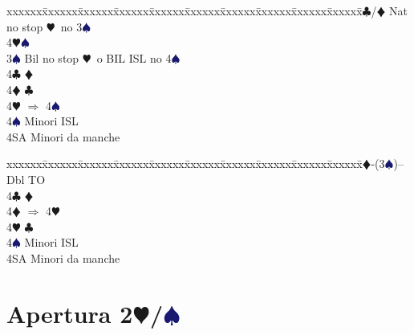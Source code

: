 \documentclass[a4paper,italian]{article}
\newcommand{\BC}{\textcolor{OliveGreen}{$\clubsuit$}}
\newcommand{\BD}{\textcolor{RedOrange}{$\vardiamondsuit$}}
\newcommand{\BH}{\textcolor{Red2}{$\varheartsuit${}}}
\newcommand{\BS}{\textcolor{MidnightBlue}{$\spadesuit${}}}
\newcommand{\pdfh}{\texorpdfstring{\BH{}}{H}}
\newcommand{\pdfs}{\texorpdfstring{\BS{}}{S}}
\newenvironment{bidtable}
{\begin{tabbing}

    xxxxxx\=xxxxxx\=xxxxxx\=xxxxxx\=xxxxxx\=xxxxxx\=xxxxxx\=xxxxxx\=xxxxxx\=xxxxxx\=\kill}
{\end{tabbing} }%
\begin{document}
\begin{multicols}{2}
\begin{bidtable}
        4\BC/\BD\> Nat no stop \BH\ no 3\BS\ \\
        4\BH{}\BS \-\\
        3\BS \> Bil no stop \BH\ o BIL ISL no 4\BS \\
        4\BC \> \BD \\
        4\BD \> \BC \\
        4\BH \> $\Rightarrow$ 4\BS \\
        4\BS \> Minori ISL\\
        4SA \> Minori da manche\-
    \end{bidtable}
    \begin{bidtable}
        2\BD-(3\BS)--\+\\
        Dbl \> TO\\
        4\BC \> \BD \\
        4\BD \> $\Rightarrow$ 4\BH \\
        4\BH \> \BC \\
        4\BS \> Minori ISL\\
        4SA \> Minori da manche\-
    \end{bidtable}
\end{multicols}

\newpage

\section{Apertura 2\pdfh/\pdfs}
\end{document}
